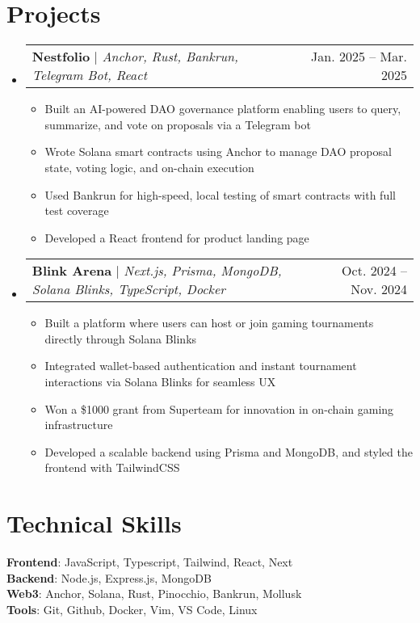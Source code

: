 \documentclass[letterpaper,11pt]{article}
\makeatletter
\newcommand{\resumeItem}[1]{
  \item\small{
    {#1 \vspace{-2pt}}
  }
}
\newcommand{\resumeProjectHeading}[2]{
    \item
    \begin{tabular*}{0.97\textwidth}{l@{\extracolsep{\fill}}r}
      \small#1 & #2 \\
    \end{tabular*}\vspace{-7pt}
}
\newcommand{\resumeSubHeadingListStart}{\begin{itemize}[leftmargin=0.15in, label={}]}
\newcommand{\resumeSubHeadingListEnd}{\end{itemize}}
\newcommand{\resumeItemListStart}{\begin{itemize}}
\newcommand{\resumeItemListEnd}{\end{itemize}\vspace{-5pt}}
\makeatother
\begin{document}
\section{Projects}
    \resumeSubHeadingListStart
      \resumeProjectHeading
          {\textbf{Nestfolio} $|$ \emph{Anchor, Rust, Bankrun, Telegram Bot, React}}{Jan. 2025 -- Mar. 2025}
          \resumeItemListStart
            \resumeItem{Built an AI-powered DAO governance platform enabling users to query, summarize, and vote on proposals via a Telegram bot}
    \resumeItem{Wrote Solana smart contracts using Anchor to manage DAO proposal state, voting logic, and on-chain execution}
    \resumeItem{Used Bankrun for high-speed, local testing of smart contracts with full test coverage}
    \resumeItem{Developed a React frontend for product landing page}
          \resumeItemListEnd
      \resumeProjectHeading
          {\textbf{Blink Arena} $|$ \emph{Next.js, Prisma, MongoDB, Solana Blinks, TypeScript, Docker}}{Oct. 2024 -- Nov. 2024}
          \resumeItemListStart
                \resumeItem{Built a platform where users can host or join gaming tournaments directly through Solana Blinks}
    \resumeItem{Integrated wallet-based authentication and instant tournament interactions via Solana Blinks for seamless UX}
    \resumeItem{Won a \$1000 grant from Superteam for innovation in on-chain gaming infrastructure}
    \resumeItem{Developed a scalable backend using Prisma and MongoDB, and styled the frontend with TailwindCSS}
          \resumeItemListEnd
    \resumeSubHeadingListEnd


\section{Technical Skills}
 \begin{itemize}[leftmargin=0.15in, label={}]
    \small{\item{
     \textbf{Frontend}{: JavaScript, Typescript, Tailwind, React, Next} \\
     \textbf{Backend}{: Node.js, Express.js, MongoDB} \\
     \textbf{Web3}{: Anchor, Solana, Rust, Pinocchio, Bankrun, Mollusk} \\
     \textbf{Tools}{: Git, Github, Docker, Vim, VS Code, Linux}
    }}
 \end{itemize}

\end{document}
